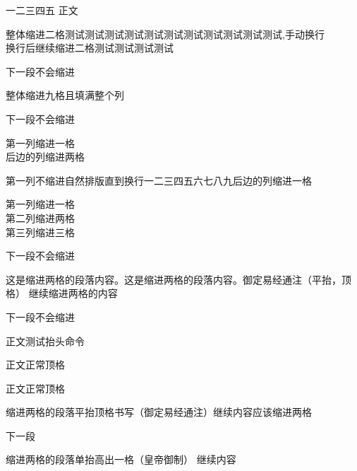 \documentclass{ltc-guji}
\begin{document}
\begin{正文}

一二三四五
\newpage
正文

\begin{段落}[indent=2]
整体缩进二格测试测试测试测试测试测试测试测试测试测试测试,手动换行\\
换行后继续缩进二格测试测试测试测试
\end{段落}

下一段不会缩进

\begin{段落}[indent=9]
整体缩进九格且填满整个列
\end{段落}

下一段不会缩进

\begin{段落}[indent=2,first-indent=1]
第一列缩进一格\\
后边的列缩进两格
\end{段落}

\begin{段落}[indent=1,first-indent=0]
第一列不缩进自然排版直到换行一二三四五六七八九后边的列缩进一格
\end{段落}

\begin{段落}[indent=2]
第一列缩进一格\\
第二列缩进两格\\
第三列缩进三格\\
\end{段落}

下一段不会缩进

\begin{段落}[indent=2]
这是缩进两格的段落内容。这是缩进两格的段落内容。 御定易经通注（平抬，顶格）
继续缩进两格的内容
\end{段落}

下一段不会缩进

\newpage
{} 正文测试抬头命令

正文正常顶格

正文正常顶格

\begin{段落}[indent=2]
缩进两格的段落 平抬顶格书写（御定易经通注）继续内容应该缩进两格
\end{段落}

下一段

\begin{段落}[indent=2]
缩进两格的段落 单抬高出一格（皇帝御制）
继续内容
\end{段落}


\end{正文}
\end{document}
